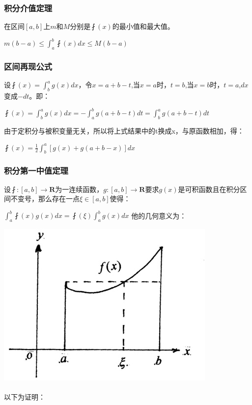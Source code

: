 \documentclass[UTF8]{ctexbook}
\newcommand{\defFunction}[1]{\fint(#1)}
\newcommand{\definiteIntegral}[2]{\int^{#1}_{#2}}
\begin{document}
{{{\subsubsection{积分介值定理}{

  在区间$[a,b]$上$m$和$M$分别是$\defFunction{x}$的最小值和最大值。

  $m(b - a) \leq \definiteIntegral{b}{a}\defFunction{x}dx \leq M(b - a)$

}%

\subsubsection{区间再现公式}{
  设$\defFunction{x} = \definiteIntegral{a}{b}g(x)dx$，令$x = a + b - t$,当$x = a$时，$t = b$,当$x = b$时，$t = a$,$dx$变成$-dt$。即：

  $\defFunction{x} = \definiteIntegral{a}{b}g(x)dx = -\definiteIntegral{b}{a}g(a+b-t)dt = \definiteIntegral{a}{b}g(a + b - t)dt$

  由于定积分与被积变量无关，所以将上式结果中的t换成x，与原函数相加，得：

  $\defFunction{x} = \frac{1}{2}\definiteIntegral{a}{b}[g(x) + g(a + b - x)]dx$
}%

\subsubsection{积分第一中值定理}{
设$\fint:[a,b] \to \mathbf{R}$为一连续函数，$g:[a,b] \to \mathbf{R}$要求$g(x)$是可积函数且在积分区间不变号，那么存在一点$\xi\in[a,b]$使得：

$\definiteIntegral{b}{a}\defFunction{x}g(x)dx = \defFunction{\xi}\definiteIntegral{b}{a}g(x)dx$
他的几何意义为：

\includegraphics{resources/Geometric_explanation_of_the_mean_value_theorem_for_integration.jpg}
\\\\
以下为证明：

}}}}
\end{document}
